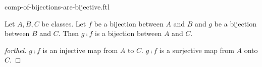 \documentclass{naproche-library}
\begin{document}
\begin{smodule}[title=Compositions of Bijections are Bijective]{comp-of-bijections-are-bijective.ftl}


\begin{proposition}[forthel,id=CompOfBijectMapsIsBijectProp]
  Let $A, B, C$ be classes.
  Let $f$ be a bijection between $A$ and $B$ and $g$ be a bijection between $B$ and $C$.
  Then $g \comp f$ is a bijection between $A$ and $C$.
\end{proposition}
\begin{proof}[forthel]
  $g \comp f$ is an injective map from $A$ to $C$.
  $g \comp f$ is a surjective map from $A$ onto $C$.
\end{proof}

\end{smodule}
\end{document}
